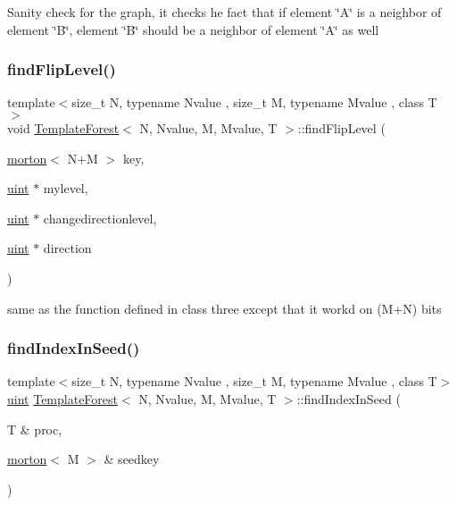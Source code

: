 Sanity check for the graph, it checks he fact that if element \char`\"{}\+A\char`\"{} is a neighbor of element \char`\"{}\+B\char`\"{}, element \char`\"{}\+B\char`\"{} should be a neighbor of element \char`\"{}\+A\char`\"{} as well \mbox{\label{classTemplateForest_a555d9f60caf33b715ab58fa808170ebe}} 
\subsubsection{\texorpdfstring{find\+Flip\+Level()}{findFlipLevel()}}
{\footnotesize\ttfamily template$<$size\+\_\+t N, typename Nvalue , size\+\_\+t M, typename Mvalue , class T $>$ \\
void \mbox{\hyperlink{classTemplateForest}{Template\+Forest}}$<$ N, Nvalue, M, Mvalue, T $>$\+::find\+Flip\+Level (\begin{DoxyParamCaption}\item[{\mbox{\hyperlink{definitions_8h_af8682350bd8bb38ee9023f7a0a310add}{morton}}$<$ N+M $>$}]{key,  }\item[{\mbox{\hyperlink{definitions_8h_a69aa29b598b851b0640aa225a9e5d61d}{uint}} $\ast$}]{mylevel,  }\item[{\mbox{\hyperlink{definitions_8h_a69aa29b598b851b0640aa225a9e5d61d}{uint}} $\ast$}]{changedirectionlevel,  }\item[{\mbox{\hyperlink{definitions_8h_a69aa29b598b851b0640aa225a9e5d61d}{uint}} $\ast$}]{direction }\end{DoxyParamCaption})}

same as the function defined in class three except that it workd on (M+N) bits \mbox{\label{classTemplateForest_a94408f59c9721a96092d96b273c5d6b7}} 
\subsubsection{\texorpdfstring{find\+Index\+In\+Seed()}{findIndexInSeed()}}
{\footnotesize\ttfamily template$<$size\+\_\+t N, typename Nvalue , size\+\_\+t M, typename Mvalue , class T$>$ \\
\mbox{\hyperlink{definitions_8h_a69aa29b598b851b0640aa225a9e5d61d}{uint}} \mbox{\hyperlink{classTemplateForest}{Template\+Forest}}$<$ N, Nvalue, M, Mvalue, T $>$\+::find\+Index\+In\+Seed (\begin{DoxyParamCaption}\item[{T \&}]{proc,  }\item[{\mbox{\hyperlink{definitions_8h_af8682350bd8bb38ee9023f7a0a310add}{morton}}$<$ M $>$ \&}]{seedkey }\end{DoxyParamCaption})}

